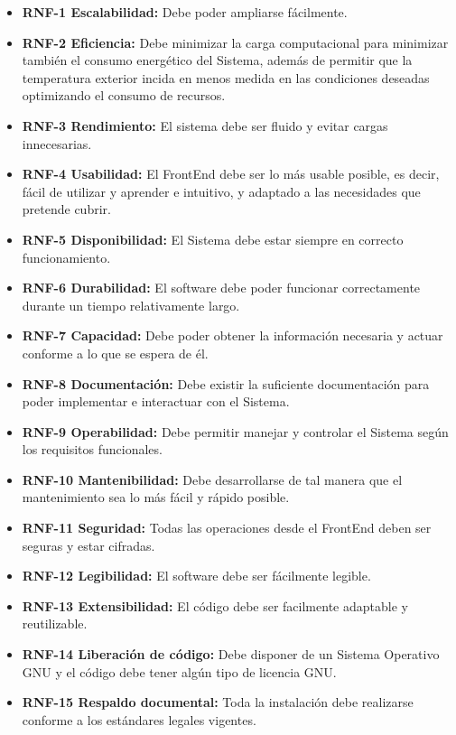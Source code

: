 \begin{itemize}
    \item \textbf{RNF-1 Escalabilidad:} Debe poder ampliarse fácilmente.
    \item \textbf{RNF-2 Eficiencia:} Debe minimizar la carga computacional para minimizar también el consumo energético del Sistema, además de permitir que la temperatura exterior incida en menos medida en las condiciones deseadas optimizando el consumo de recursos.
    \item \textbf{RNF-3 Rendimiento:} El sistema debe ser fluido y evitar cargas innecesarias.
    \item \textbf{RNF-4 Usabilidad:} El FrontEnd debe ser lo más usable posible, es decir, fácil de utilizar y aprender e intuitivo, y adaptado a las necesidades que pretende cubrir.
    \item \textbf{RNF-5 Disponibilidad:} El Sistema debe estar siempre en correcto funcionamiento.
    \item \textbf{RNF-6 Durabilidad:} El software debe poder funcionar correctamente durante un tiempo relativamente largo.
    \item \textbf{RNF-7 Capacidad:} Debe poder obtener la información necesaria y actuar conforme a lo que se espera de él.
    \item \textbf{RNF-8 Documentación:} Debe existir la suficiente documentación para poder implementar e interactuar con el Sistema.
    \item \textbf{RNF-9 Operabilidad:} Debe permitir manejar y controlar el Sistema según los requisitos funcionales.
    \item \textbf{RNF-10 Mantenibilidad:} Debe desarrollarse de tal manera que el mantenimiento sea lo más fácil y rápido posible.
    \item \textbf{RNF-11 Seguridad:} Todas las operaciones desde el FrontEnd deben ser seguras y estar cifradas.
    \item \textbf{RNF-12 Legibilidad:} El software debe ser fácilmente legible.
    \item \textbf{RNF-13 Extensibilidad:} El código debe ser facilmente adaptable y reutilizable.
    \item \textbf{RNF-14 Liberación de código:} Debe disponer de un Sistema Operativo GNU y el código debe tener algún tipo de licencia GNU.
    \item \textbf{RNF-15 Respaldo documental:} Toda la instalación debe realizarse conforme a los estándares legales vigentes.

\end{itemize}

